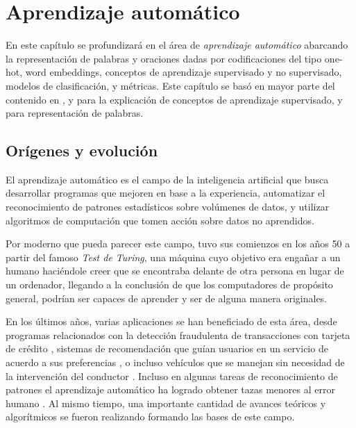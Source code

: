 \chapter{Aprendizaje automático}
\label{ch:lit_ml}

En este capítulo se profundizará en el área de \emph{aprendizaje automático}
abarcando la representación de palabras y oraciones dadas por codificaciones del
tipo one-hot, word embeddings, conceptos de aprendizaje supervisado y no
supervisado, modelos de clasificación, y métricas. Este capítulo se basó en
mayor parte del contenido en \citep{Bishop-2006}, y \citep{Tianqi-2016} para la
explicación de conceptos de aprendizaje supervisado, y
\citep{Bojanowski-Grave-Joulin-Mikolov-2016, bojanowski-2017, Mikolov-2013} para
representación de palabras.

\section{Orígenes y evolución}

El aprendizaje automático es el campo de la inteligencia artificial que busca
desarrollar programas que mejoren en base a la experiencia, automatizar el
reconocimiento de patrones estadísticos sobre volúmenes de datos, y utilizar
algoritmos de computación que tomen acción sobre datos no aprendidos.

Por moderno que pueda parecer este campo, tuvo sus comienzos en los años 50 a
partir del famoso \emph{Test de Turing}, una máquina cuyo objetivo era engañar a
un humano haciéndole creer que se encontraba delante de otra persona en lugar de
un ordenador, llegando a la conclusión de que los computadores de propósito
general, podrían ser capaces de aprender y ser de alguna manera originales.
\citep{test-turing-website}

En los últimos años, varias aplicaciones se han beneficiado de esta área, desde
programas relacionados con la detección fraudulenta de transacciones con tarjeta
de crédito \citep{Fang-2021}, sistemas de recomendación que guían usuarios en un
servicio de acuerdo a sus preferencias \citep{Burke-2007}, o incluso vehículos
que se manejan sin necesidad de la intervención del conductor
\citep{Sorin-2019}. Incluso en algunas tareas de reconocimiento de patrones el
aprendizaje automático ha logrado obtener tazas menores al error humano
\citep{niklas-et-al-2020}. Al mismo tiempo, una importante cantidad de avances
teóricos y algorítmicos se fueron realizando formando las bases de este campo. 

